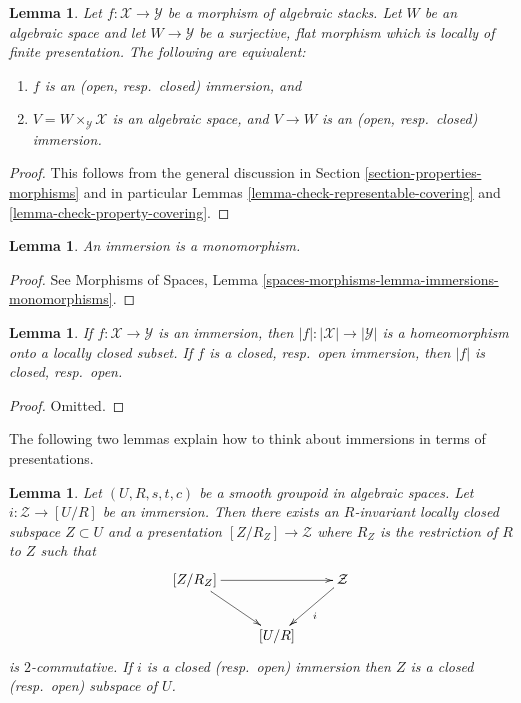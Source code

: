 \documentclass{stacks-project}
\theoremstyle{plain}
\newtheorem{lemma}[subsection]{Lemma}
\theoremstyle{definition}
\theoremstyle{remark}
\numberwithin{equation}{subsection}
\begin{document}
\begin{lemma}
\label{lemma-check-immersion-covering}
Let $f : \mathcal{X} \to \mathcal{Y}$ be a morphism of algebraic stacks.
Let $W$ be an algebraic space and let $W \to \mathcal{Y}$ be a surjective,
flat morphism which is locally of finite presentation. The following
are equivalent:
\begin{enumerate}
\item $f$ is an (open, resp.\ closed) immersion, and
\item $V = W \times_\mathcal{Y} \mathcal{X}$ is an algebraic space, and
$V \to W$ is an (open, resp.\ closed) immersion.
\end{enumerate}
\end{lemma}

\begin{proof}
This follows from the general discussion in
Section \ref{section-properties-morphisms}
and in particular
Lemmas \ref{lemma-check-representable-covering} and
\ref{lemma-check-property-covering}.
\end{proof}

\begin{lemma}
\label{lemma-immersion-monomorphism}
An immersion is a monomorphism.
\end{lemma}

\begin{proof}
See
Morphisms of Spaces,
Lemma \ref{spaces-morphisms-lemma-immersions-monomorphisms}.
\end{proof}

\begin{lemma}
\label{lemma-subspace-induced-topology}
If $f : \mathcal{X} \to \mathcal{Y}$ is an immersion, then
$|f| : |\mathcal{X}| \to |\mathcal{Y}|$ is a homeomorphism
onto a locally closed subset. If $f$ is a closed, resp.\ open
immersion, then $|f|$ is closed, resp.\ open.
\end{lemma}

\begin{proof}
Omitted.
\end{proof}

\noindent
The following two lemmas explain how to think about
immersions in terms of presentations.

\begin{lemma}
\label{lemma-immersion-into-presentation}
Let $(U, R, s, t, c)$ be a smooth groupoid in algebraic spaces.
Let $i : \mathcal{Z} \to [U/R]$ be an immersion.
Then there exists an $R$-invariant locally closed subspace
$Z \subset U$ and a presentation $[Z/R_Z] \to \mathcal{Z}$
where $R_Z$ is the restriction of $R$ to $Z$ such that
$$
\xymatrix{
[Z/R_Z] \ar[dr] \ar[rr] & & \mathcal{Z} \ar[ld]^i \\
& [U/R]
}
$$
is $2$-commutative. If $i$ is a closed (resp.\ open) immersion
then $Z$ is a closed (resp.\ open) subspace of $U$.
\end{lemma}
\end{document}
